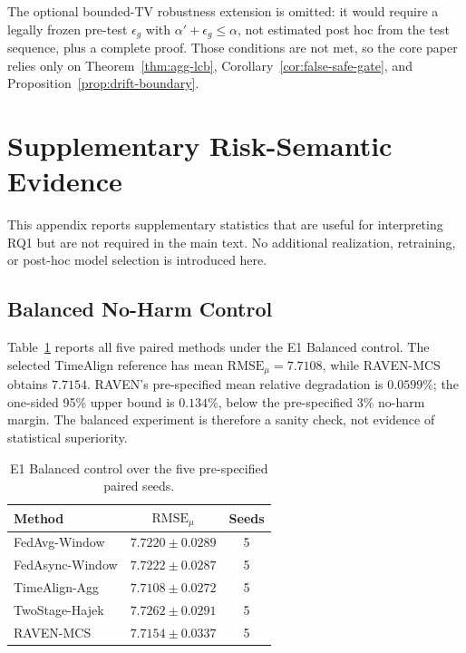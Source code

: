 The optional bounded-TV robustness extension is omitted: it would require a
legally frozen pre-test $\epsilon_g$ with $\alpha'+\epsilon_g\le\alpha$, not
estimated post hoc from the test sequence, plus a complete proof.  Those
conditions are not met, so the core paper relies only on
Theorem~\ref{thm:agg-lcb}, Corollary~\ref{cor:false-safe-gate}, and
Proposition~\ref{prop:drift-boundary}.


\section{Supplementary Risk-Semantic Evidence}
\label{app:risk_semantic_evidence}

This appendix reports supplementary statistics that are useful for interpreting
RQ1 but are not required in the main text.  No additional realization,
retraining, or post-hoc model selection is introduced here.

\subsection{Balanced No-Harm Control}
\label{app:e1_balanced}

Table~\ref{tab:app_e1_balanced} reports all five paired methods under the E1
Balanced control.  The selected TimeAlign reference has mean
$\mathrm{RMSE}_\mu=7.7108$, while RAVEN-MCS obtains $7.7154$.  RAVEN's
pre-specified mean relative degradation is $0.0599\%$; the one-sided 95\%
upper bound is $0.134\%$, below the pre-specified $3\%$ no-harm margin.  The
balanced experiment is therefore a sanity check, not evidence of statistical
superiority.

\begin{table}[!t]
\centering
\caption{E1 Balanced control over the five pre-specified paired seeds.}
\label{tab:app_e1_balanced}
\footnotesize
\setlength{\tabcolsep}{5pt}
\begin{tabular*}{\columnwidth}{@{\extracolsep{\fill}}lcc}
\toprule
Method & $\mathrm{RMSE}_\mu$ & Seeds\\
\midrule
FedAvg-Window & $7.7220\pm0.0289$ & 5 \\
FedAsync-Window & $7.7222\pm0.0287$ & 5 \\
TimeAlign-Agg & $7.7108\pm0.0272$ & 5 \\
TwoStage-Hajek & $7.7262\pm0.0291$ & 5 \\
RAVEN-MCS & $7.7154\pm0.0337$ & 5 \\
\bottomrule
\end{tabular*}
\end{table}

